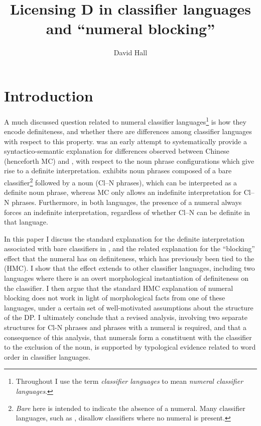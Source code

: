 \documentclass[output=paper
,modfonts
,nonflat]{langsci/langscibook}
\title{Licensing D in classifier languages and ``numeral blocking''}
\author{%
	David Hall\affiliation{Queen Mary University of London}
}
\begin{document}
\maketitle\settowidth\jamwidth{}

\section{Introduction}

A much discussed question related to numeral classifier languages\footnote{Throughout I use the term \textit{classifier languages} to mean \textit{numeral classifier languages}.} is how they encode definiteness, and whether there are differences among classifier languages with respect to this property. \citet{ChengSybesma1999} was an early attempt to systematically provide a syntactico-semantic explanation for differences observed between  Chinese (henceforth MC) and , with respect to the noun phrase configurations which give rise to a definite interpretation.  exhibits noun phrases composed of a bare classifier\footnote{\textit{Bare} here is intended to indicate the absence of a numeral. Many classifier languages, such as , disallow classifiers where no numeral is present.} followed by a noun (Cl--N phrases), which can be interpreted as a definite noun phrase, whereas MC only allows an indefinite interpretation for Cl--N phrases. Furthermore, in both languages, the presence of a numeral always forces an indefinite interpretation, regardless of whether Cl--N can be definite in that language. 

In this paper I discuss the standard explanation for the definite interpretation associated with bare classifiers in , and the related explanation for the ``blocking'' effect that the numeral has on definiteness, which has previously been tied to the  (HMC). I show that the  effect extends to other classifier languages, including two languages where there is an overt morphological instantiation of definiteness on the classifier. I then argue that the standard HMC explanation of numeral blocking does not work in light of morphological facts from one of these languages, under a certain set of well-motivated assumptions about the structure of the DP. I ultimately conclude that a revised analysis, involving two separate structures for Cl-N phrases and phrases with a numeral is required, and that a consequence of this analysis, that numerals form a constituent with the classifier to the exclusion of the noun, is supported by typological evidence related to word order in classifier languages.
\end{document}
